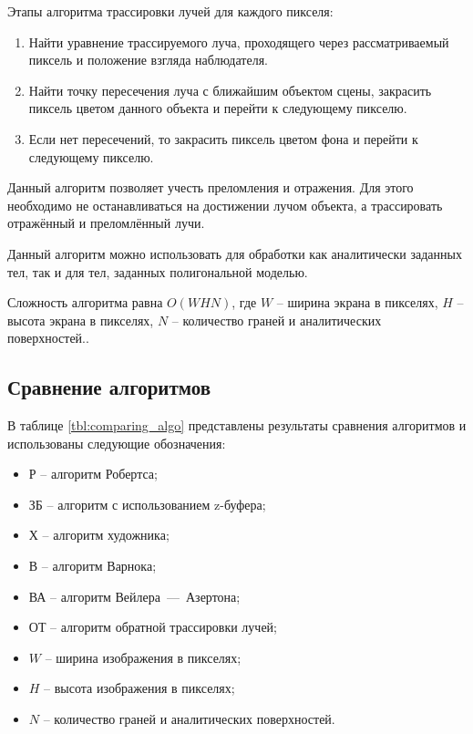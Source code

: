 Этапы алгоритма трассировки лучей для каждого пикселя:
\begin{enumerate}[label=\arabic*)]
    \item Найти уравнение трассируемого луча, проходящего через рассматриваемый пиксель и положение взгляда наблюдателя.
    \item Найти точку пересечения луча с ближайшим объектом сцены, закрасить пиксель цветом данного объекта и перейти к следующему пикселю.
    \item Если нет пересечений, то закрасить пиксель цветом фона и перейти к следующему пикселю.
\end{enumerate}

Данный алгоритм позволяет учесть преломления и отражения. Для этого необходимо не останавливаться на достижении лучом объекта, а трассировать отражённый и преломлённый лучи.

Данный алгоритм можно использовать для обработки как аналитически заданных тел, так и для тел, заданных полигональной моделью.

Сложность алгоритма равна $O(WHN)$, где $W$ -- ширина экрана в пикселях, $H$ -- высота экрана в пикселях, $N$ -- количество граней и аналитических поверхностей..


\clearpage

\subsection{Сравнение алгоритмов}

В таблице \ref{tbl:comparing_algo} представлены результаты сравнения алгоритмов и использованы следующие обозначения:

\begin{itemize}[label=---]
    \item Р -- алгоритм Робертса;
    \item ЗБ -- алгоритм с использованием z-буфера;
    \item Х -- алгоритм художника;
    \item В -- алгоритм Варнока;
    \item ВА -- алгоритм Вейлера~---~Азертона;
    \item ОТ -- алгоритм обратной трассировки лучей;
    \item $W$ -- ширина изображения в пикселях;
    \item $H$ -- высота изображения в пикселях;
    \item $N$ -- количество граней и аналитических поверхностей.
\end{itemize}

